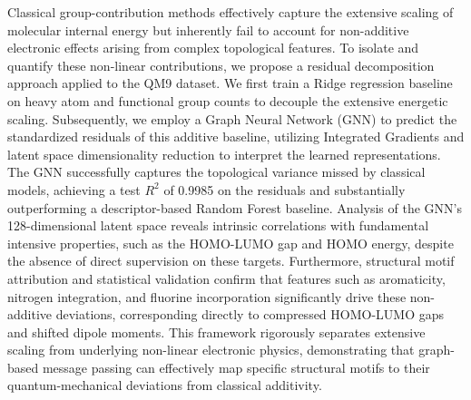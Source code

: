 \documentclass[]{article}
\begin{document}
Classical group-contribution methods effectively capture the extensive scaling of molecular internal energy but inherently fail to account for non-additive electronic effects arising from complex topological features. To isolate and quantify these non-linear contributions, we propose a residual decomposition approach applied to the QM9 dataset. We first train a Ridge regression baseline on heavy atom and functional group counts to decouple the extensive energetic scaling. Subsequently, we employ a Graph Neural Network (GNN) to predict the standardized residuals of this additive baseline, utilizing Integrated Gradients and latent space dimensionality reduction to interpret the learned representations. The GNN successfully captures the topological variance missed by classical models, achieving a test $R^2$ of 0.9985 on the residuals and substantially outperforming a descriptor-based Random Forest baseline. Analysis of the GNN's 128-dimensional latent space reveals intrinsic correlations with fundamental intensive properties, such as the HOMO-LUMO gap and HOMO energy, despite the absence of direct supervision on these targets. Furthermore, structural motif attribution and statistical validation confirm that features such as aromaticity, nitrogen integration, and fluorine incorporation significantly drive these non-additive deviations, corresponding directly to compressed HOMO-LUMO gaps and shifted dipole moments. This framework rigorously separates extensive scaling from underlying non-linear electronic physics, demonstrating that graph-based message passing can effectively map specific structural motifs to their quantum-mechanical deviations from classical additivity.
\end{document}
